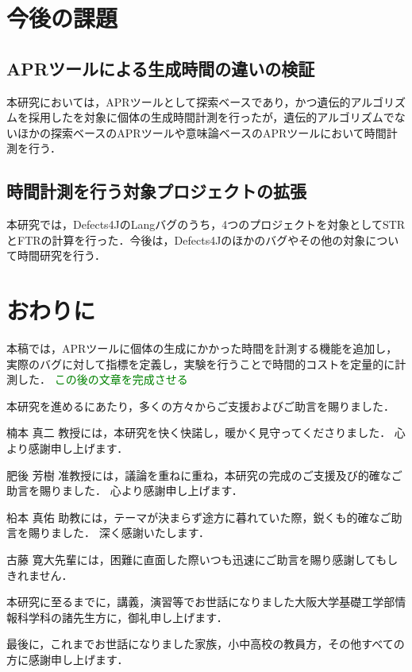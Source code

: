 \documentclass[uplatex,dvipdfmx,a4paper]{jsarticle}
\newcommand{\TODO}[1]{{\textcolor{green}{#1}}}
\begin{document}
\section{今後の課題}\label{sec:ftrclg}
\subsection{APRツールによる生成時間の違いの検証}
本研究においては，APRツールとして探索ベースであり，かつ遺伝的アルゴリズムを採用した\kgp を対象に個体の生成時間計測を行ったが，遺伝的アルゴリズムでないほかの探索ベースのAPRツールや意味論ベースのAPRツールにおいて時間計測を行う．
\subsection{時間計測を行う対象プロジェクトの拡張}
本研究では，Defects4JのLangバグのうち，4つのプロジェクトを対象としてSTRとFTRの計算を行った．今後は，Defects4Jのほかのバグやその他の対象について時間研究を行う．
\clearpage
\section{おわりに}\label{sec:concl}
本稿では，APRツールに個体の生成にかかった時間を計測する機能を追加し，実際のバグに対して指標を定義し，実験を行うことで時間的コストを定量的に計測した．
\TODO{この後の文章を完成させる}
\clearpage
\acknowledgement

本研究を進めるにあたり，多くの方々からご支援およびご助言を賜りました．

楠本 真二 教授には，本研究を快く快諾し，暖かく見守ってくださりました．
心より感謝申し上げます．

肥後 芳樹 准教授には，議論を重ねに重ね，本研究の完成のご支援及び的確なご助言を賜りました．
心より感謝申し上げます．

柗本 真佑 助教には，テーマが決まらず途方に暮れていた際，鋭くも的確なご助言を賜りました．
深く感謝いたします．

古藤 寛大先輩には，困難に直面した際いつも迅速にご助言を賜り感謝してもしきれません．

本研究に至るまでに，講義，演習等でお世話になりました大阪大学基礎工学部情報科学科の諸先生方に，御礼申し上げます．

最後に，これまでお世話になりました家族，小中高校の教員方，その他すべての方に感謝申し上げます．
\clearpage


\end{document}
